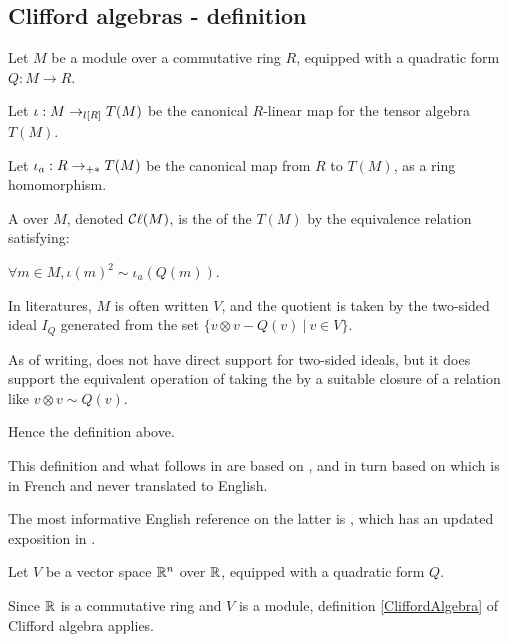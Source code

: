 \subsection{Clifford algebras - definition}
\label{sec:def}

\begin{definition}
    \label{CliffordAlgebra}
    \leanok

    Let $M$ be a module over a commutative ring $R$, equipped with a quadratic form $Q: M \to R$.

    Let $\iota : M \lmap{R} T(M)$ be the canonical $R$-linear map for the tensor algebra $T(M)$.

    Let $\iota_a : R \amap{R} T(M)$ be the canonical map from $R$ to $T(M)$, as a ring homomorphism.

    A  over $M$, denoted $\Cl (M)$, is
    the  of the  $T(M)$
    by the equivalence relation satisfying:

    $\forall m \in M, \iota(m)^2 \sim \iota_a(Q(m))$.
\end{definition}

\begin{remark}
  \label{mk:two_sided_ideals}
  
  In literatures, $M$ is often written $V$, and the quotient is taken by the two-sided ideal $I_Q$ generated from the set
  $\{ v \otimes v - Q(v) \:\vert\: v \in V \}$.

  As of writing, \Mathlib does not have direct support for two-sided ideals,
  but it does support the equivalent operation of taking the  by a suitable closure of
  a relation like $v \otimes v \sim Q(v)$.

  Hence the definition above.

\end{remark}

\begin{remark}
  \label{mk:CliffordAlgebra}
  
  This definition and what follows in \Mathlib are based on \cite{garling2011clifford},
  and in turn based on \cite{bourbaki2007} which is in French and never translated to English.

  The most informative English reference on the latter is \cite{jadczyk2019notes}, 
  which has an updated exposition in \cite{jadczyk2023bundle}.
\end{remark}

\begin{example}
  \label{ex:clifford_algebra_v}

  Let $V$ be a vector space $\RR^n$ over $\RR$, equipped with a quadratic form $Q$.
  
  Since $\RR$ is a commutative ring and $V$ is a module,
  definition \ref{CliffordAlgebra} of Clifford algebra applies.
\end{example}
